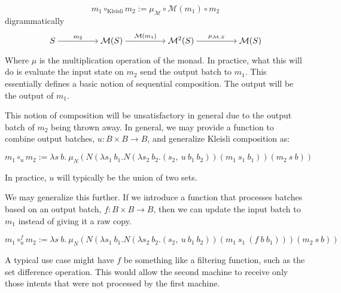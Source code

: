 \begin{equation}
    m_1 \circ_{\text{Kleisli}} m_2 := \mu_{\mathcal{M}} \circ \mathcal{M}(m_1) \circ m_2
\end{equation}
digrammatically
\[\begin{tikzcd}[cramped]
	S && {\mathcal{M}(S)} && {\mathcal{M}^2(S)} && {\mathcal{M}(S)}
	\arrow["{m_2}", from=1-1, to=1-3]
	\arrow["{\mathcal{M}(m_1)}", from=1-3, to=1-5]
	\arrow["{\mu_{\mathcal{M}, S}}", from=1-5, to=1-7]
\end{tikzcd}\]

Where $\mu$ is the multiplication operation of the monad. In practice, what this will do is evaluate the input state on $m_2$ send the output batch to $m_1$. This essentially defines a basic notion of sequential composition. The output will be the output of $m_1$.

This notion of composition will be unsatisfactory in general due to the output batch of $m_2$ being thrown away. In general, we may provide a function to combine output batches, $u : B \times B \rightarrow B$, and generalize Kleisli composition as:

\begin{equation}\label{eq:Klesli-composition}
    m_1 \circ_{u} m_2 := \lambda s\ b.\ \mu_{N}(N(\lambda s_1\ b_1. N(\lambda s_2\ b_2. (s_2,\ u\ b_1\ b_2)) (m_1\ s_1\ b_1)) (m_2\ s\ b))
\end{equation}

In practice, $u$ will typically be the union of two sets.

We may generalize this further. If we introduce a function that processes batches based on an output batch, $f : B \times B \rightarrow B$, then we can update the input batch to $m_1$ instead of giving it a raw copy.

\begin{equation}\label{eq:Klesli-composition-f}
    m_1 \circ^{f}_{u} m_2 := \lambda s\ b.\ \mu_{N}(N(\lambda s_1\ b_1. N(\lambda s_2\ b_2. (s_2,\ u\ b_1\ b_2)) (m_1\ s_1\ (f\ b\ b_1))) (m_2\ s\ b))
\end{equation}


A typical use case might have $f$ be something like a filtering function, such as the set difference operation. This would allow the second machine to receive only those intents that were not processed by the first machine.

